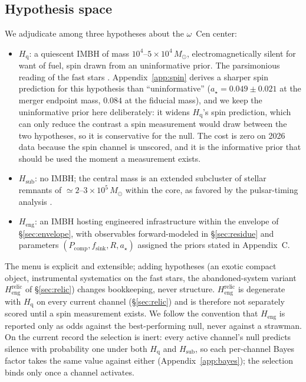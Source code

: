 \documentclass[11pt]{article}
\newcommand{\msun}{\ensuremath{M_\odot}}
\newcommand{\astar}{\ensuremath{a_\star}}
\newcommand{\ocen}{\ensuremath{\omega}~Cen}
\newcommand{\Heng}{\ensuremath{H_{\mathrm{eng}}}}
\newcommand{\Hgas}{\ensuremath{H_{\mathrm{q}}}}
\newcommand{\Hsub}{\ensuremath{H_{\mathrm{sub}}}}
\begin{document}
\subsection{Hypothesis space}
\label{sec:hypotheses}

We adjudicate among three hypotheses about the \ocen{} center:
\begin{itemize}
\item \Hgas: a quiescent IMBH of mass $10^{4}$--$5\times10^{4}\,\msun$, electromagnetically silent for want of fuel, spin drawn from an uninformative prior. The parsimonious reading of the fast stars \citep{Haberle2024Nature}. Appendix~\ref{app:spin} derives a sharper spin prediction for this hypothesis than ``uninformative'' ($\astar = 0.049 \pm 0.021$ at the merger endpoint mass, $0.084$ at the fiducial mass), and we keep the uninformative prior here deliberately: it widens \Hgas's spin prediction, which can only reduce the contrast a spin measurement would draw between the two hypotheses, so it is conservative for the null. The cost is zero on 2026 data because the spin channel is unscored, and it is the informative prior that should be used the moment a measurement exists.
\item \Hsub: no IMBH; the central mass is an extended subcluster of stellar remnants of $\simeq 2$--$3\times10^{5}\,\msun$ within the core, as favored by the pulsar-timing analysis \citep{BanaresHernandez2025}.
\item \Heng: an IMBH hosting engineered infrastructure within the envelope of \S\ref{sec:envelope}, with observables forward-modeled in \S\ref{sec:residue} and parameters $(P_{\mathrm{comp}}, f_{\mathrm{sink}}, R, \astar)$ assigned the priors stated in Appendix~C.
\end{itemize}
The menu is explicit and extensible; adding hypotheses (an exotic compact object, instrumental systematics on the fast stars, the abandoned-system variant \ensuremath{H_{\mathrm{eng}}^{\mathrm{relic}}} of \S\ref{sec:relic}) changes bookkeeping, never structure. \ensuremath{H_{\mathrm{eng}}^{\mathrm{relic}}} is degenerate with \Hgas{} on every current channel (\S\ref{sec:relic}) and is therefore not separately scored until a spin measurement exists. We follow the convention that \Heng{} is reported only as odds against the
best-performing null, never against a strawman. On the current record the
selection is inert: every active channel's null predicts silence with
probability one under both \Hgas{} and \Hsub{}, so each per-channel Bayes
factor takes the same value against either (Appendix~\ref{app:bayes}); the
selection binds only once a channel activates.
\end{document}
